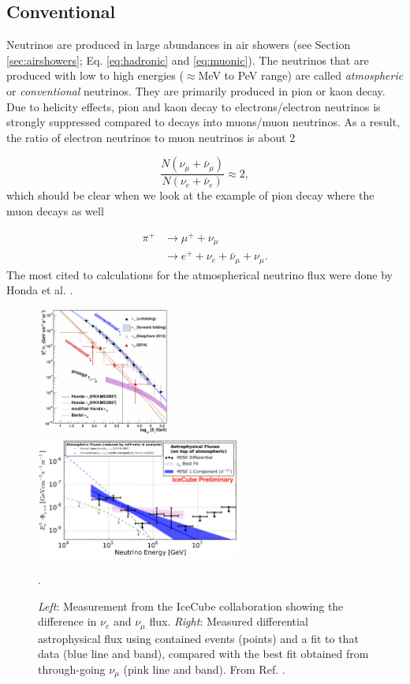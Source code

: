 \subsection{Conventional}
Neutrinos are produced in large abundances in air showers (see Section \ref{sec:airshowers}; Eq. \ref{eq:hadronic} and \ref{eq:muonic}). The neutrinos that are produced with low to high energies ($\approx$MeV to PeV range) are called \textit{atmospheric} or \textit{conventional} neutrinos. They are primarily produced in pion or kaon decay. Due to helicity effects, pion and kaon decay to electrons/electron neutrinos is strongly suppressed compared to decays into muons/muon neutrinos. As a result, the ratio of electron neutrinos to muon neutrinos is about 2

\begin{equation}
\frac{N\left( \nu_\mu + \bar{\nu}_\mu\right) }{N\left(\nu_e + \bar{\nu}_e\right)} \approx 2,
\end{equation}
which should be clear when we look at the example of pion decay where the muon decays as well

\begin{align}
\pi^+ &\rightarrow \mu^+ + \nu_\mu \nonumber \\
& \rightarrow e^+ + \nu_e + \bar{\nu}_\mu + \nu_\mu.
\end{align}
The most cited to calculations for the atmospherical neutrino flux were done by Honda et al. \cite{Honda:2006qj}.
\begin{figure}[t]
\centering
\includegraphics[width=0.39\textwidth]{chapter3/img/neutrinospectrum2.png}
\includegraphics[width=0.6\textwidth]{chapter3/img/astroflux.png}
\caption{\textit{Left}: Measurement from the IceCube collaboration showing the difference in $\nu_e$ and $\nu_\mu$ flux. \textit{Right}: Measured differential astrophysical flux using contained events (points) and a fit to that data (blue line and band), compared with the best fit obtained from through-going $\nu_\mu$ (pink line and band). From Ref. \cite{Aartsen:2017mau}.}.
\label{fig:neutrinospectrum2}
\end{figure}

